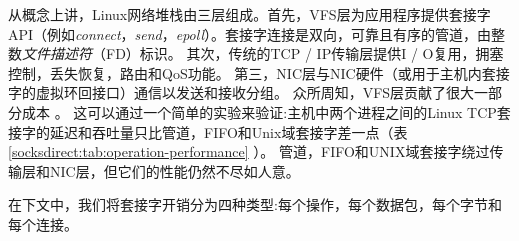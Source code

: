 从概念上讲，Linux网络堆栈由三层组成。首先，VFS层为应用程序提供套接字API（例如\emph {connect}，\emph {send}，\emph {epoll}）。套接字连接是双向，可靠且有序的管道，由整数\emph {文件描述符}（FD）标识。
其次，传统的TCP / IP传输层提供I / O复用，拥塞控制，丢失恢复，路由和QoS功能。
第三，NIC层与NIC硬件（或用于主机内套接字的虚拟环回接口）通信以发送和接收分组。
众所周知，VFS层贡献了很大一部分成本 \cite {clark1989analysis,boyd2010analysis}。
这可以通过一个简单的实验来验证:主机中两个进程之间的Linux TCP套接字的延迟和吞吐量只比管道，FIFO和Unix域套接字差一点（表 \ref {socksdirect:tab:operation-performance} ）。
管道，FIFO和UNIX域套接字绕过传输层和NIC层，但它们的性能仍然不尽如人意。

在下文中，我们将套接字开销分为四种类型:每个操作，每个数据包，每个字节和每个连接。


